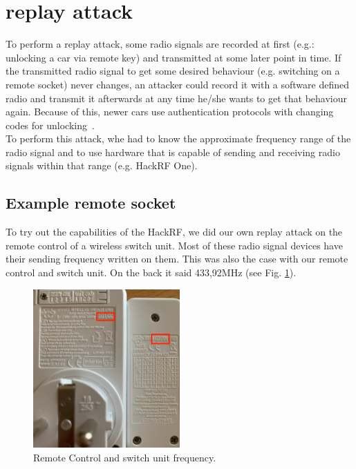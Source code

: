 \documentclass[conference]{IEEEtran}
\begin{document}
\section{replay attack} %
\label{replayattack}

To perform a replay attack, some radio signals are recorded at first (e.g.: unlocking a car via remote key) and transmitted at some later point in time. If the transmitted radio signal to get some desired behaviour (e.g. switching on a remote socket) never changes, an attacker could record it with a software defined radio and transmit it afterwards at any time he/she wants to get that behaviour again. Because of this, newer cars use authentication protocols with changing codes for unlocking~\cite{verdult2015cryptanalysis}.\\
To perform this attack, whe had to know the approximate frequency range of the radio signal and to use hardware that is capable of sending and receiving radio signals within that range (e.g. HackRF One). 

\subsection{Example remote socket}
To try out the capabilities of the HackRF, we did our own replay attack on the remote control of a wireless switch unit. Most of these radio signal devices have their sending frequency written on them. This was also the case with our remote control and switch unit. On the back it said 433,92MHz (see Fig. \ref{fig:remote}).

\begin{figure}[H]
	\centering
	\includegraphics[width=0.5\textwidth]{remote_control_and_switch}
	\caption{Remote Control and switch unit frequency.}
	\label{fig:remote}
\end{figure}
\end{document}
